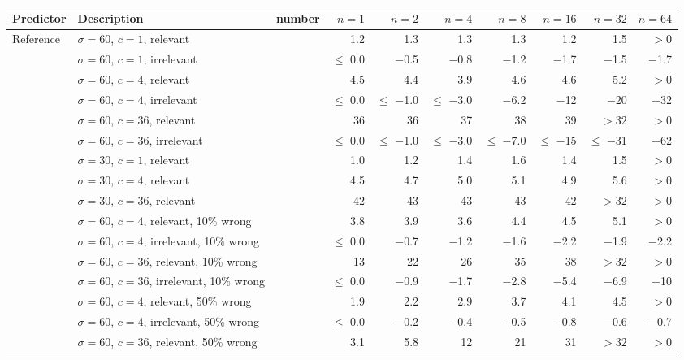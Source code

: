 \begin{tabular}{llrrrrrrrr}
\toprule
Predictor & Description & number & $n = 1$ & $n = 2$ & $n = 4$ & $n = 8$ & $n = 16$ & $n = 32$ & $n = 64$ \\
\midrule
Reference & $\sigma = 60$, $c = 1$, relevant &  & 1.2 & 1.3 & 1.3 & 1.3 & 1.2 & 1.5 & $> 0$ \\
 & $\sigma = 60$, $c = 1$, irrelevant &  & $\leq$ 0.0 & $-$0.5 & $-$0.8 & $-$1.2 & $-$1.7 & $-$1.5 & $-$1.7 \\
 & $\sigma = 60$, $c = 4$, relevant &  & 4.5 & 4.4 & 3.9 & 4.6 & 4.6 & 5.2 & $> 0$ \\
 & $\sigma = 60$, $c = 4$, irrelevant &  & $\leq$ 0.0 & $\leq$ $-$1.0 & $\leq$ $-$3.0 & $-$6.2 & $-$12 & $-$20 & $-$32 \\
 & $\sigma = 60$, $c = 36$, relevant &  & 36 & 36 & 37 & 38 & 39 & $> 32$ & $> 0$ \\
 & $\sigma = 60$, $c = 36$, irrelevant &  & $\leq$ 0.0 & $\leq$ $-$1.0 & $\leq$ $-$3.0 & $\leq$ $-$7.0 & $\leq$ $-$15 & $\leq$ $-$31 & $-$62 \\
 & $\sigma = 30$, $c = 1$, relevant &  & 1.0 & 1.2 & 1.4 & 1.6 & 1.4 & 1.5 & $> 0$ \\
 & $\sigma = 30$, $c = 4$, relevant &  & 4.5 & 4.7 & 5.0 & 5.1 & 4.9 & 5.6 & $> 0$ \\
 & $\sigma = 30$, $c = 36$, relevant &  & 42 & 43 & 43 & 43 & 42 & $> 32$ & $> 0$ \\
 & $\sigma = 60$, $c = 4$, relevant, 10\% wrong &  & 3.8 & 3.9 & 3.6 & 4.4 & 4.5 & 5.1 & $> 0$ \\
 & $\sigma = 60$, $c = 4$, irrelevant, 10\% wrong &  & $\leq$ 0.0 & $-$0.7 & $-$1.2 & $-$1.6 & $-$2.2 & $-$1.9 & $-$2.2 \\
 & $\sigma = 60$, $c = 36$, relevant, 10\% wrong &  & 13 & 22 & 26 & 35 & 38 & $> 32$ & $> 0$ \\
 & $\sigma = 60$, $c = 36$, irrelevant, 10\% wrong &  & $\leq$ 0.0 & $-$0.9 & $-$1.7 & $-$2.8 & $-$5.4 & $-$6.9 & $-$10 \\
 & $\sigma = 60$, $c = 4$, relevant, 50\% wrong &  & 1.9 & 2.2 & 2.9 & 3.7 & 4.1 & 4.5 & $> 0$ \\
 & $\sigma = 60$, $c = 4$, irrelevant, 50\% wrong &  & $\leq$ 0.0 & $-$0.2 & $-$0.4 & $-$0.5 & $-$0.8 & $-$0.6 & $-$0.7 \\
 & $\sigma = 60$, $c = 36$, relevant, 50\% wrong &  & 3.1 & 5.8 & 12 & 21 & 31 & $> 32$ & $> 0$ \\

\end{tabular}
